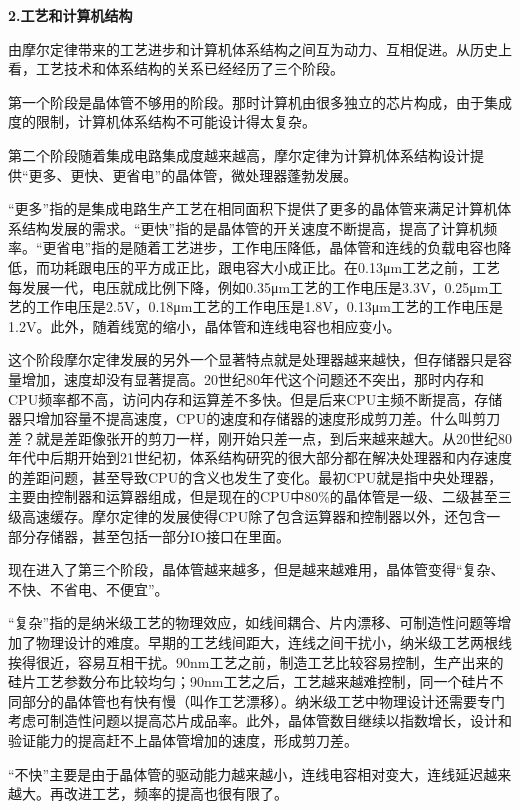 \documentclass[]{ctexbook}
\begin{document}
\textbf{2.工艺和计算机结构}

由摩尔定律带来的工艺进步和计算机体系结构之间互为动力、互相促进。从历史上看，工艺技术和体系结构的关系已经经历了三个阶段。

第一个阶段是晶体管不够用的阶段。那时计算机由很多独立的芯片构成，由于集成度的限制，计算机体系结构不可能设计得太复杂。

第二个阶段随着集成电路集成度越来越高，摩尔定律为计算机体系结构设计提供``更多、更快、更省电''的晶体管，微处理器蓬勃发展。

``更多''指的是集成电路生产工艺在相同面积下提供了更多的晶体管来满足计算机体系结构发展的需求。``更快''指的是晶体管的开关速度不断提高，提高了计算机频率。``更省电''指的是随着工艺进步，工作电压降低，晶体管和连线的负载电容也降低，而功耗跟电压的平方成正比，跟电容大小成正比。在0.13μm工艺之前，工艺每发展一代，电压就成比例下降，例如0.35μm工艺的工作电压是3.3V，0.25μm工艺的工作电压是2.5V，0.18μm工艺的工作电压是1.8V，0.13μm工艺的工作电压是1.2V。此外，随着线宽的缩小，晶体管和连线电容也相应变小。

这个阶段摩尔定律发展的另外一个显著特点就是处理器越来越快，但存储器只是容量增加，速度却没有显著提高。20世纪80年代这个问题还不突出，那时内存和CPU频率都不高，访问内存和运算差不多快。但是后来CPU主频不断提高，存储器只增加容量不提高速度，CPU的速度和存储器的速度形成剪刀差。什么叫剪刀差？就是差距像张开的剪刀一样，刚开始只差一点，到后来越来越大。从20世纪80年代中后期开始到21世纪初，体系结构研究的很大部分都在解决处理器和内存速度的差距问题，甚至导致CPU的含义也发生了变化。最初CPU就是指中央处理器，主要由控制器和运算器组成，但是现在的CPU中80\%的晶体管是一级、二级甚至三级高速缓存。摩尔定律的发展使得CPU除了包含运算器和控制器以外，还包含一部分存储器，甚至包括一部分IO接口在里面。

现在进入了第三个阶段，晶体管越来越多，但是越来越难用，晶体管变得``复杂、不快、不省电、不便宜''。

``复杂''指的是纳米级工艺的物理效应，如线间耦合、片内漂移、可制造性问题等增加了物理设计的难度。早期的工艺线间距大，连线之间干扰小，纳米级工艺两根线挨得很近，容易互相干扰。90nm工艺之前，制造工艺比较容易控制，生产出来的硅片工艺参数分布比较均匀；90nm工艺之后，工艺越来越难控制，同一个硅片不同部分的晶体管也有快有慢（叫作工艺漂移）。纳米级工艺中物理设计还需要专门考虑可制造性问题以提高芯片成品率。此外，晶体管数目继续以指数增长，设计和验证能力的提高赶不上晶体管增加的速度，形成剪刀差。

``不快''主要是由于晶体管的驱动能力越来越小，连线电容相对变大，连线延迟越来越大。再改进工艺，频率的提高也很有限了。
\end{document}
